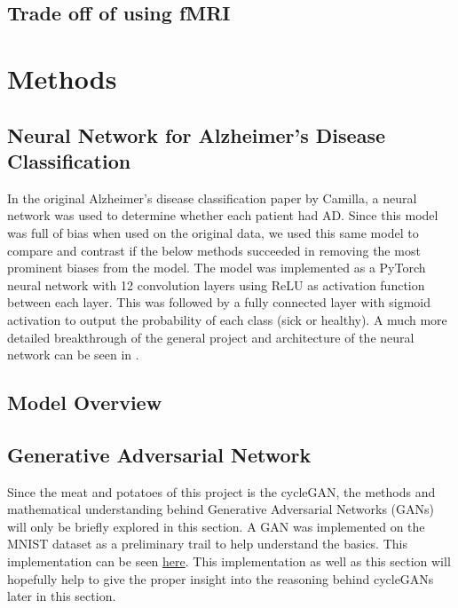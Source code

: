 \documentclass[12pt, fleqn, titlepage]{article}
\begin{document}
\subsection{Trade off of using fMRI}


\section{Methods}
\subsection{Neural Network for Alzheimer's Disease Classification}
In the original Alzheimer's disease classification paper by Camilla, a neural network was used to determine whether each patient had AD. Since this model was full of bias when used on the original data, we used this same model to compare and contrast if the below methods succeeded in removing the most prominent biases from the model. The model was implemented as a PyTorch neural network with 12 convolution layers using ReLU as activation function between each layer. This was followed by a fully connected layer with sigmoid activation to output the probability of each class (sick or healthy). A much more detailed breakthrough of the general project and architecture of the neural network can be seen in \cite{CamillaKandidat}.

\subsection{Model Overview}

\subsection{Generative Adversarial Network}
Since the meat and potatoes of this project is the cycleGAN, the methods and mathematical understanding behind Generative Adversarial Networks (GANs) will only be briefly explored in this section. A GAN was implemented on the MNIST dataset as a preliminary trail to help understand the basics. This implementation can be seen \href{https://github.com/oskarwiese/AlzPred/blob/main/preliminary/GAN_MNIST.ipynb}{here}. This implementation as well as this section will hopefully help to give the proper insight into the reasoning behind cycleGANs later in this section.
\end{document}
